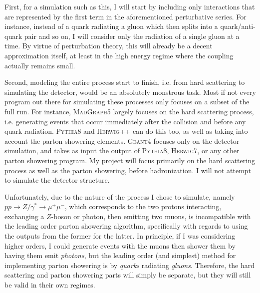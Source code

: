 First, for a simulation such as this, I will start by including only interactions that are represented by the first term in the aforementioned perturbative series. For instance, instead of a quark radiating a gluon which then splits into a quark/anti-quark pair and so on, I will consider only the radiation of a single gluon at a time. By virtue of perturbation theory, this will already be a decent approximation itself, at least in the high energy regime where the coupling actually remains small.

Second, modeling the entire process start to finish, i.e. from hard scattering to simulating the detector, would be an absolutely monstrous task. Most if not every program out there for simulating these processes only focuses on a subset of the full run. For instance, \textsc{MadGraph5} largely focuses on the hard scattering process, i.e. generating events that occur immediately after the collision and before any quark radiation. \textsc{Pythia8} and \textsc{Herwig++} can do this too, as well as taking into account the parton showering elements. \textsc{Geant4} focuses only on the detector simulation, and takes as input the output of \textsc{Pythia8}, \textsc{Herwig7}, or any other parton showering program. My project will focus primarily on the hard scattering process as well as the parton showering, before hadronization. I will not attempt to simulate the detector structure.

Unfortunately, due to the nature of the process I chose to simulate, namely $pp \rightarrow Z/\gamma^* \rightarrow \mu^+\mu^-$, which corresponds to the two protons interacting, exchanging a $Z$-boson or photon, then emitting two muons, is incompatible with the leading order parton showering algorithm, specifically with regards to using the outputs from the former for the latter. In principle, if I was considering higher orders, I could generate events with the muons then shower them by having them emit \textit{photons}, but the leading order (and simplest) method for implementing parton showering is by \textit{quarks} radiating \textit{gluons}. Therefore, the hard scattering and parton showering parts will simply be separate, but they will still be valid in their own regimes.



